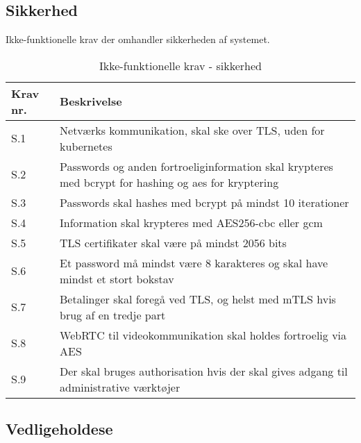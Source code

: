 \subsection{Sikkerhed}

Ikke-funktionelle krav der omhandler sikkerheden af systemet.

\begin{table}[H]
    \centering
    \caption{Ikke-funktionelle krav - sikkerhed}
    \label{tab:if-security}
    \begin{tabular}{p{1cm}|p{8cm}}
        \textbf{Krav nr.} & \textbf{Beskrivelse}                                                                                                               \\\hline
        S.1               & \multicolumn{1}{p{8cm}}{Netværks kommunikation, skal ske over TLS, uden for kubernetes} \\\hline
        S.2               & \multicolumn{1}{p{8cm}}{Passwords og anden fortroeliginformation skal krypteres med bcrypt for hashing og aes for kryptering} \\\hline
        S.3               & \multicolumn{1}{p{8cm}}{Passwords skal hashes med bcrypt på mindst 10 iterationer} \\\hline
        S.4               & \multicolumn{1}{p{8cm}}{Information skal krypteres med AES256-cbc eller gcm} \\\hline
        S.5               & \multicolumn{1}{p{8cm}}{TLS certifikater skal være på mindst 2056 bits} \\\hline
        S.6               & \multicolumn{1}{p{8cm}}{Et password må mindst være 8 karakteres og skal have mindst et stort bokstav} \\\hline
        S.7               & \multicolumn{1}{p{8cm}}{Betalinger skal foregå ved TLS, og helst med mTLS hvis brug af en tredje part} \\\hline
        S.8               & \multicolumn{1}{p{8cm}}{WebRTC til videokommunikation skal holdes fortroelig via AES} \\\hline
        S.9               & \multicolumn{1}{p{8cm}}{Der skal bruges authorisation hvis der skal gives adgang til administrative værktøjer} \\\hline
    \end{tabular}
\end{table}

\subsection{Vedligeholdese}

